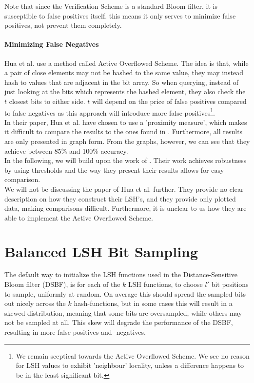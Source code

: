 \documentclass[a4paper,11pt]{article}
\begin{document}
Note that since the Verification Scheme is a standard Bloom filter, it is susceptible to false positives itself. this means it only serves to minimize false positives, not prevent them completely.

\paragraph{Minimizing False Negatives}
Hua et al. use a method called Active Overflowed Scheme. The idea is that, while a pair of close elements may not be hashed to the same value, they may instead hash to values that are adjacent in the bit array. So when querying, instead of just looking at the bits which represents the hashed element, they also check the $t$ closest bits to either side. $t$ will depend on the price of false positives compared to false negatives as this approach will introduce more false positives\footnote{We remain sceptical towards the Active Overflowed Scheme. We see no reason for LSH values to exhibit 'neighbour' locality, unless a difference happens to be in the least significant bit.
}.\\

In their paper, Hua et al. have chosen to use a 'proximity measure', which makes it difficult to compare the results to the ones found in \cite{paper:harvard}. Furthermore, all results are only presented in graph form. From the graphs, however, we can see that they achieve between 85\% and 100\% accuracy.\\


In the following, we will build upon the work of \cite{paper:harvard}.  Their work achieves robustness by using thresholds and the way they present their results allows for easy comparison.\\

We will not be discussing the paper of Hua et al.\cite{paper:hua} further. They provide no clear description on how they construct their LSH's, and they provide only plotted data, making comparisons difficult. Furthermore, it is unclear to us how they are able to implement the Active Overflowed Scheme.

\section{Balanced LSH Bit Sampling} \label{sec:balanced}

The default way to initialize the LSH functions used in the Distance-Sensitive Bloom filter (DSBF), is for each of the $k$ LSH functions, to choose $l'$ bit positions to sample, uniformly at random. On average this should spread the sampled bits out nicely across the $k$ hash-functions, but in some cases this will result in a skewed distribution, meaning that some bits are oversampled, while others may not be sampled at all. This skew will degrade the performance of the DSBF, resulting in more false positives and -negatives.
\end{document}
